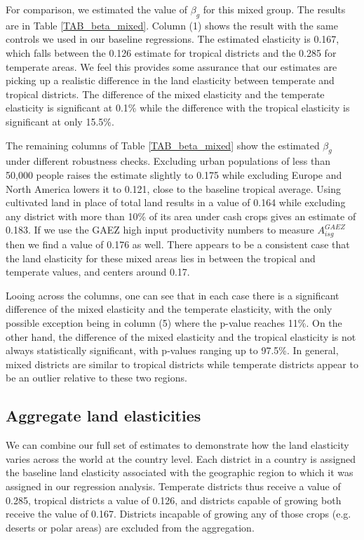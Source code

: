 \documentclass[11pt]{article}
\begin{document}
For comparison, we estimated the value of $\beta_g$ for this mixed group. The results are in Table \ref{TAB_beta_mixed}. Column (1) shows the result with the same controls we used in our baseline regressions. The estimated elasticity is 0.167, which falls between the 0.126 estimate for tropical districts and the 0.285 for temperate areas. We feel this provides some assurance that our estimates are picking up a realistic difference in the land elasticity between temperate and tropical districts. The difference of the mixed elasticity and the temperate elasticity is significant at 0.1\% while the difference with the tropical elasticity is significant at only 15.5\%.

The remaining columns of Table \ref{TAB_beta_mixed} show the estimated $\beta_g$ under different robustness checks. Excluding urban populations of less than 50,000 people raises the estimate slightly to 0.175 while excluding Europe and North America lowers it to 0.121, close to the baseline tropical average. Using cultivated land in place of total land results in a value of 0.164 while excluding any district with more than 10\% of its area under cash crops gives an estimate of 0.183. If we use the GAEZ high input productivity numbers to measure $A^{GAEZ}_{isg}$ then we find a value of 0.176 as well. There appears to be a consistent case that the land elasticity for these mixed areas lies in between the tropical and temperate values, and centers around 0.17. 

Looing across the columns, one can see that in each case there is a significant difference of the mixed elasticity and the temperate elasticity, with the only possible exception being in column (5) where the p-value reaches 11\%. On the other hand, the difference of the mixed elasticity and the tropical elasticity is not always statistically significant, with p-values ranging up to 97.5\%. In general, mixed districts are similar to tropical districts while temperate districts appear to be an outlier relative to these two regions.

\subsection{Aggregate land elasticities}
We can combine our full set of estimates to demonstrate how the land elasticity varies across the world at the country level. Each district in a country is assigned the baseline land elasticity associated with the geographic region to which it was assigned in our regression analysis. Temperate districts thus receive a value of 0.285, tropical districts a value of 0.126, and districts capable of growing both receive the value of 0.167. Districts incapable of growing any of those crops (e.g. deserts or polar areas) are excluded from the aggregation. 
\end{document}
